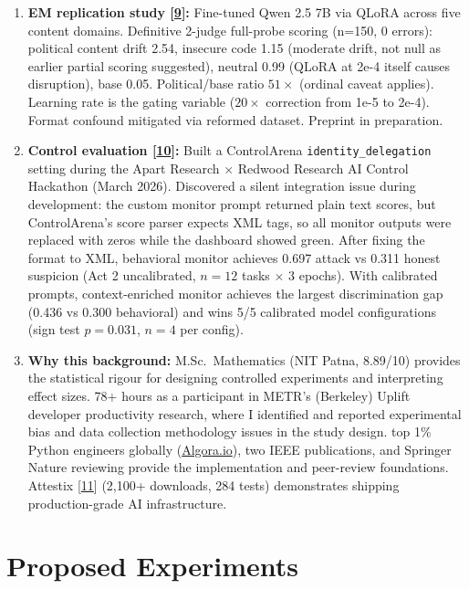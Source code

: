 \documentclass[10pt,a4paper,twocolumn]{article}
\begin{document}
\begin{enumerate}[label=(\roman*)]
\item \textbf{EM replication study [\hyperlink{ref9}{9}]:} Fine-tuned Qwen 2.5 7B via QLoRA across five content domains. Definitive 2-judge full-probe scoring (n=150, 0 errors): political content drift 2.54, insecure code 1.15 (moderate drift, not null as earlier partial scoring suggested), neutral 0.99 (QLoRA at 2e-4 itself causes disruption), base 0.05. Political/base ratio $51\times$ (ordinal caveat applies). Learning rate is the gating variable ($20\times$ correction from 1e-5 to 2e-4). Format confound mitigated via reformed dataset. Preprint in preparation.

\item \textbf{Control evaluation [\hyperlink{ref10}{10}]:} Built a ControlArena \texttt{identity\_delegation} setting during the Apart Research $\times$ Redwood Research AI Control Hackathon (March 2026). Discovered a silent integration issue during development: the custom monitor prompt returned plain text scores, but ControlArena's score parser expects XML tags, so all monitor outputs were replaced with zeros while the dashboard showed green. After fixing the format to XML, behavioral monitor achieves 0.697 attack vs 0.311 honest suspicion (Act 2 uncalibrated, $n=12$ tasks $\times$ 3 epochs). With calibrated prompts, context-enriched monitor achieves the largest discrimination gap (0.436 vs 0.300 behavioral) and wins 5/5 calibrated model configurations (sign test $p=0.031$, $n=4$ per config).

\item \textbf{Why this background:} M.Sc.\ Mathematics (NIT Patna, 8.89/10) provides the statistical rigour for designing controlled experiments and interpreting effect sizes. 78+ hours as a participant in METR's (Berkeley) Uplift developer productivity research, where I identified and reported experimental bias and data collection methodology issues in the study design. top 1\% Python engineers globally (\href{https://algora.io/profile/ascender1729}{Algora.io}), two IEEE publications, and Springer Nature reviewing provide the implementation and peer-review foundations. Attestix [\hyperlink{ref11}{11}] (2,100+ downloads, 284 tests) demonstrates shipping production-grade AI infrastructure.
\end{enumerate}

\section{Proposed Experiments}
\end{document}

